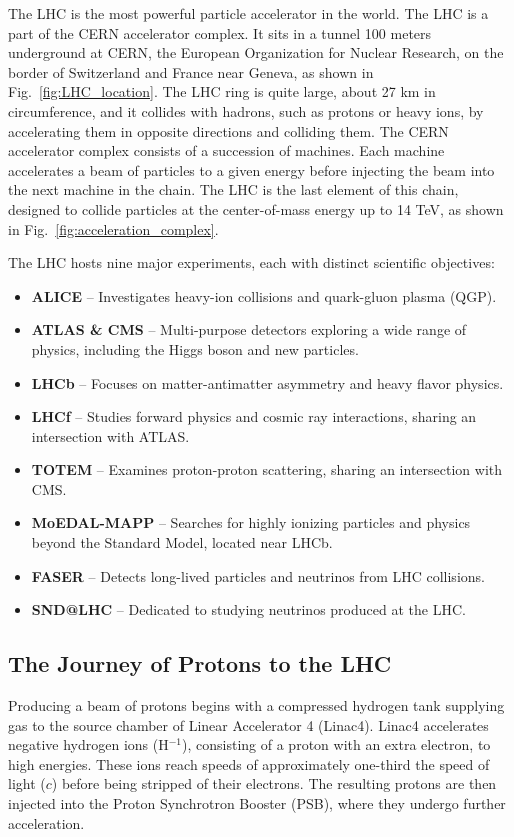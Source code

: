 The LHC is the most powerful particle accelerator in the world. The LHC is a part of the CERN accelerator complex. It sits in a tunnel 100 meters underground at CERN, the European Organization for Nuclear Research, on the border of Switzerland and France near Geneva, as shown in Fig.~\ref{fig:LHC_location}.
The LHC ring is quite large, about 27 km in circumference, and it collides with hadrons, such as protons or heavy ions, by accelerating them in opposite directions and colliding them.
The CERN accelerator complex consists of a succession of machines.
Each machine accelerates a beam of particles to a given energy before injecting the beam into the next machine in the chain.
The LHC is the last element of this chain, designed to collide particles at the center-of-mass energy up to 14 TeV, as shown in Fig.~\ref{fig:acceleration_complex}. 

The LHC hosts nine major experiments, each with distinct scientific objectives:
\begin{itemize}
\item {\bf ALICE} – Investigates heavy-ion collisions and quark-gluon plasma (QGP).
\item {\bf ATLAS \& CMS} – Multi-purpose detectors exploring a wide range of physics, including the Higgs boson and new particles.
\item {\bf LHCb} – Focuses on matter-antimatter asymmetry and heavy flavor physics.
\item {\bf LHCf} – Studies forward physics and cosmic ray interactions, sharing an intersection with ATLAS.
\item {\bf TOTEM} – Examines proton-proton scattering, sharing an intersection with CMS.
\item {\bf MoEDAL-MAPP} – Searches for highly ionizing particles and physics beyond the Standard Model, located near LHCb.
\item {\bf FASER} – Detects long-lived particles and neutrinos from LHC collisions.
\item {\bf SND@LHC} – Dedicated to studying neutrinos produced at the LHC.
\end{itemize}

\subsection{The Journey of Protons to the LHC}
Producing a beam of protons begins with a compressed hydrogen tank supplying gas to the source chamber of Linear Accelerator 4 (Linac4).
Linac4 accelerates negative hydrogen ions (H$^{-1}$), consisting of a proton with an extra electron, to high energies.
These ions reach speeds of approximately one-third the speed of light ($c$) before being stripped of their electrons.
The resulting protons are then injected into the Proton Synchrotron Booster (PSB), where they undergo further acceleration.

